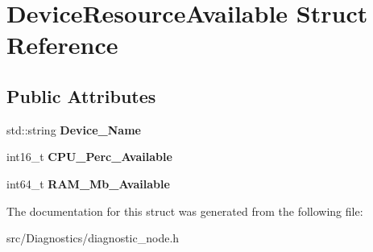 \hypertarget{structDeviceResourceAvailable}{}\section{Device\+Resource\+Available Struct Reference}
\label{structDeviceResourceAvailable}
\subsection*{Public Attributes}
\begin{DoxyCompactItemize}
\item 
\mbox{\label{structDeviceResourceAvailable_ae6b18a614250851fd38d4a5f2cfa7984}} 
std\+::string {\bfseries Device\+\_\+\+Name}
\item 
\mbox{\label{structDeviceResourceAvailable_ae3f36b751e006682c37078aff9a31549}} 
int16\+\_\+t {\bfseries C\+P\+U\+\_\+\+Perc\+\_\+\+Available}
\item 
\mbox{\label{structDeviceResourceAvailable_a1b7c925b7c2faeed50df3cb1ac93399b}} 
int64\+\_\+t {\bfseries R\+A\+M\+\_\+\+Mb\+\_\+\+Available}
\end{DoxyCompactItemize}


The documentation for this struct was generated from the following file\+:\begin{DoxyCompactItemize}
\item 
src/\+Diagnostics/diagnostic\+\_\+node.\+h\end{DoxyCompactItemize}
